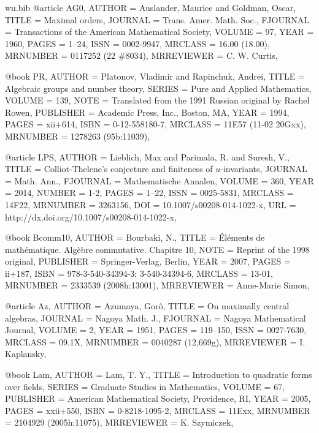 \documentclass{amsart}
\numberwithin{equation}{section}
\theoremstyle{plain}
\theoremstyle{definition}
\begin{document}
\begin{filecontents}{wu.bib}
@article {AG0, 
    AUTHOR = {Auslander, Maurice and Goldman, Oscar},
     TITLE = {Maximal orders},
   JOURNAL = {Trans. Amer. Math. Soc.},
  FJOURNAL = {Transactions of the American Mathematical Society},
    VOLUME = {97},
      YEAR = {1960},
     PAGES = {1--24},
      ISSN = {0002-9947},
   MRCLASS = {16.00 (18.00)},
  MRNUMBER = {0117252 (22 \#8034)},
MRREVIEWER = {C. W. Curtis},
}

@book {PR, 
    AUTHOR = {Platonov, Vladimir and Rapinchuk, Andrei},
     TITLE = {Algebraic groups and number theory},
    SERIES = {Pure and Applied Mathematics},
    VOLUME = {139},
      NOTE = {Translated from the 1991 Russian original by Rachel Rowen},
 PUBLISHER = {Academic Press, Inc., Boston, MA},
      YEAR = {1994},
     PAGES = {xii+614},
      ISBN = {0-12-558180-7},
   MRCLASS = {11E57 (11-02 20Gxx)},
  MRNUMBER = {1278263 (95b:11039)},
}

@article {LPS, 
    AUTHOR = {Lieblich, Max and Parimala, R. and Suresh, V.},
     TITLE = {Colliot-{T}helene's conjecture and finiteness of
              {$u$}-invariants},
   JOURNAL = {Math. Ann.},
  FJOURNAL = {Mathematische Annalen},
    VOLUME = {360},
      YEAR = {2014},
    NUMBER = {1-2},
     PAGES = {1--22},
      ISSN = {0025-5831},
   MRCLASS = {14F22},
  MRNUMBER = {3263156},
       DOI = {10.1007/s00208-014-1022-x},
       URL = {http://dx.doi.org/10.1007/s00208-014-1022-x},
}

@book {Bcomm10, 
    AUTHOR = {Bourbaki, N.},
     TITLE = {\'{E}l\'ements de math\'ematique. {A}lg\`ebre commutative.
              {C}hapitre 10},
      NOTE = {Reprint of the 1998 original},
 PUBLISHER = {Springer-Verlag, Berlin},
      YEAR = {2007},
     PAGES = {ii+187},
      ISBN = {978-3-540-34394-3; 3-540-34394-6},
   MRCLASS = {13-01},
  MRNUMBER = {2333539 (2008h:13001)},
MRREVIEWER = {Anne-Marie Simon},
}

@article {Az, 
    AUTHOR = {Azumaya, Gor{\^o}},
     TITLE = {On maximally central algebras},
   JOURNAL = {Nagoya Math. J.},
  FJOURNAL = {Nagoya Mathematical Journal},
    VOLUME = {2},
      YEAR = {1951},
     PAGES = {119--150},
      ISSN = {0027-7630},
   MRCLASS = {09.1X},
  MRNUMBER = {0040287 (12,669g)},
MRREVIEWER = {I. Kaplansky},
}

@book {Lam, 
    AUTHOR = {Lam, T. Y.},
     TITLE = {Introduction to quadratic forms over fields},
    SERIES = {Graduate Studies in Mathematics},
    VOLUME = {67},
 PUBLISHER = {American Mathematical Society, Providence, RI},
      YEAR = {2005},
     PAGES = {xxii+550},
      ISBN = {0-8218-1095-2},
   MRCLASS = {11Exx},
  MRNUMBER = {2104929 (2005h:11075)},
MRREVIEWER = {K. Szymiczek},
}


\end{filecontents}
\end{document}
